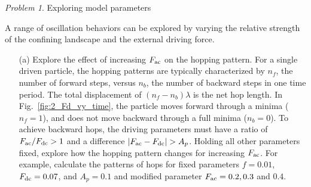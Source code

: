 \documentclass[preprint,showpacs,preprintnumbers,amsmath,amssymb,aps,prb]{revtex4-1}
\theoremstyle{remark}
\newtheorem{problem}{Problem}
\begin{document}
\begin{problem}{Exploring model parameters}
\label{ex:parameters}

\noindent A range of oscillation behaviors
can be explored by varying the
  relative strength of the confining landscape
  and the external driving force.

\begin{enumerate}

\item[(a)]
  Explore the effect of increasing $F_{\rm ac}$ on the hopping pattern.
  For a single driven particle,
  the hopping patterns are typically characterized
  by $n_f$, the number of forward steps,
  versus $n_b$, the number of backward steps  in one
  time period.
  The total displacement of $(n_f - n_b) \lambda$ 
  is the net hop length.  
  In Fig.~\ref{fig:2_Fd_vy_time},
  the particle moves forward through a minima ($n_f = 1$),
  and does not move backward through a full minima ($n_b = 0$).  
  To achieve
  backward hops,
  the driving parameters must have
  a ratio of $F_{\rm ac}/F_{\rm dc} > 1$ 
  and a difference $|F_{\rm ac} - F_{\rm dc}| > A_p$.
  Holding all other parameters fixed,
  explore how the hopping pattern
  changes for increasing $F_{\rm ac}$.
  For example,
  calculate the patterns of hops for
  fixed parameters 
  $f=0.01$, $F_{\rm dc}=0.07$, and $A_p = 0.1$
  and
  modified parameter
  $F_{\rm ac} = 0.2, 0.3$ and $0.4$.
  


\end{enumerate}
\end{problem}
\end{document}

